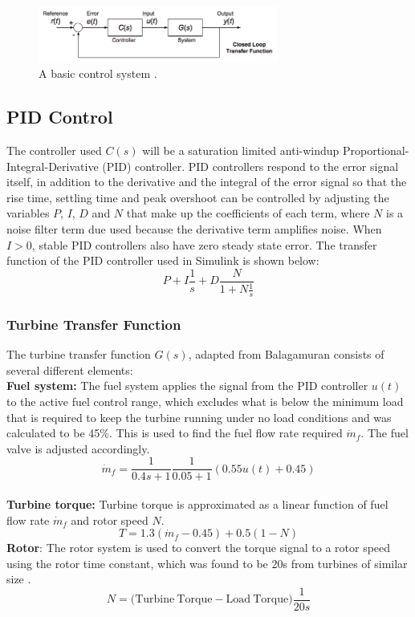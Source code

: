 \begin{figure} [h]
\centering
\includegraphics[width=0.7\textwidth]{./pictures/controlsystem.png}
  \caption{A basic control system \cite{A2notes}.} \label{fig:control}
  \end{figure}
\subsection{PID Control}

The controller used $C(s)$ will be a saturation limited anti-windup Proportional-Integral-Derivative (PID) controller. PID controllers respond to the error signal itself, in addition to the derivative and the integral of the error signal so that the rise time, settling time and peak overshoot can be controlled by adjusting the variables $P$, $I$, $D$ and $N$ that make up the coefficients of each term, where $N$ is a noise filter term due used because the derivative term amplifies noise. When $I>0$, stable PID controllers also have zero steady state error. The transfer function of the PID controller used in Simulink is shown below:
\begin{equation}
P + I\frac{1}{s} + D\frac{N}{1+N\frac{1}{s}}
\end{equation}

\subsubsection{Turbine Transfer Function}
The turbine transfer function $G(s)$, adapted from Balagamuran \cite{balagamuran} consists of several different elements:
\\\textbf{Fuel system:} The fuel system applies the signal from the PID controller $u(t)$ to the active fuel control range, which excludes what is below the minimum load that is required to keep the turbine running under no load conditions and was calculated to be 45\%. This is used to find the fuel flow rate required $\dot{m}_f$. The fuel valve is adjusted accordingly.
\begin{equation}
\dot{m}_f = \frac{1}{0.4s + 1} \frac{1}{0.05 + 1} (0.55u(t) + 0.45)
\end{equation}
\\\textbf{Turbine torque:} Turbine torque is approximated as a linear function of fuel flow rate $\dot{m}_f$ and rotor speed $N$.
\begin{equation}
T = 1.3(\dot{m}_f - 0.45) + 0.5(1 - N)
\end{equation}
\textbf{Rotor}: The rotor system is used to convert the torque signal to a rotor speed using the rotor time constant, which was found to be 20s from turbines of similar size \cite{balagamuran}.
\begin{equation}
N = (\mathrm{Turbine \ Torque - Load \ Torque)}\frac{1}{20s}
\end{equation}

